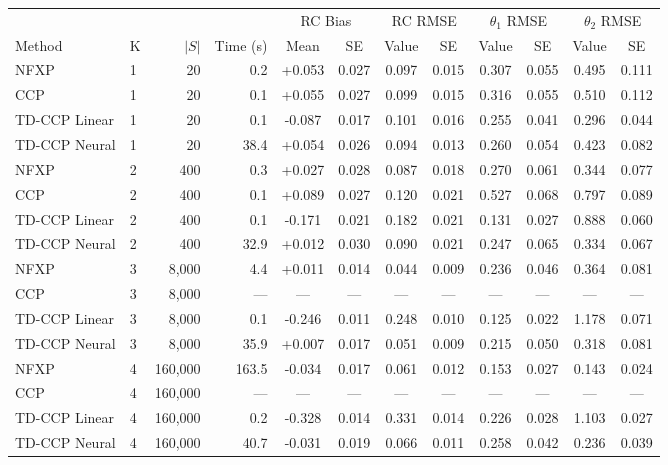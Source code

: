 \begin{tabular}{@{}ll rr cc cc cc cc@{}}
\toprule
 & & & & \multicolumn{2}{c}{RC Bias} & \multicolumn{2}{c}{RC RMSE} & \multicolumn{2}{c}{$\theta_1$ RMSE} & \multicolumn{2}{c}{$\theta_2$ RMSE} \\
\cmidrule(lr){5-6} \cmidrule(lr){7-8} \cmidrule(lr){9-10} \cmidrule(lr){11-12}
Method & K & $|S|$ & Time (s) & Mean & SE & Value & SE & Value & SE & Value & SE \\
\midrule
NFXP & 1 & 20 & 0.2 & +0.053 & 0.027 & 0.097 & 0.015 & 0.307 & 0.055 & 0.495 & 0.111 \\
CCP & 1 & 20 & 0.1 & +0.055 & 0.027 & 0.099 & 0.015 & 0.316 & 0.055 & 0.510 & 0.112 \\
TD-CCP Linear & 1 & 20 & 0.1 & -0.087 & 0.017 & 0.101 & 0.016 & 0.255 & 0.041 & 0.296 & 0.044 \\
TD-CCP Neural & 1 & 20 & 38.4 & +0.054 & 0.026 & 0.094 & 0.013 & 0.260 & 0.054 & 0.423 & 0.082 \\
\midrule
NFXP & 2 & 400 & 0.3 & +0.027 & 0.028 & 0.087 & 0.018 & 0.270 & 0.061 & 0.344 & 0.077 \\
CCP & 2 & 400 & 0.1 & +0.089 & 0.027 & 0.120 & 0.021 & 0.527 & 0.068 & 0.797 & 0.089 \\
TD-CCP Linear & 2 & 400 & 0.1 & -0.171 & 0.021 & 0.182 & 0.021 & 0.131 & 0.027 & 0.888 & 0.060 \\
TD-CCP Neural & 2 & 400 & 32.9 & +0.012 & 0.030 & 0.090 & 0.021 & 0.247 & 0.065 & 0.334 & 0.067 \\
\midrule
NFXP & 3 & 8,000 & 4.4 & +0.011 & 0.014 & 0.044 & 0.009 & 0.236 & 0.046 & 0.364 & 0.081 \\
CCP & 3 & 8,000 & --- & --- & --- & --- & --- & --- & --- & --- & --- \\
TD-CCP Linear & 3 & 8,000 & 0.1 & -0.246 & 0.011 & 0.248 & 0.010 & 0.125 & 0.022 & 1.178 & 0.071 \\
TD-CCP Neural & 3 & 8,000 & 35.9 & +0.007 & 0.017 & 0.051 & 0.009 & 0.215 & 0.050 & 0.318 & 0.081 \\
\midrule
NFXP & 4 & 160,000 & 163.5 & -0.034 & 0.017 & 0.061 & 0.012 & 0.153 & 0.027 & 0.143 & 0.024 \\
CCP & 4 & 160,000 & --- & --- & --- & --- & --- & --- & --- & --- & --- \\
TD-CCP Linear & 4 & 160,000 & 0.2 & -0.328 & 0.014 & 0.331 & 0.014 & 0.226 & 0.028 & 1.103 & 0.027 \\
TD-CCP Neural & 4 & 160,000 & 40.7 & -0.031 & 0.019 & 0.066 & 0.011 & 0.258 & 0.042 & 0.236 & 0.039 \\
\bottomrule
\end{tabular}